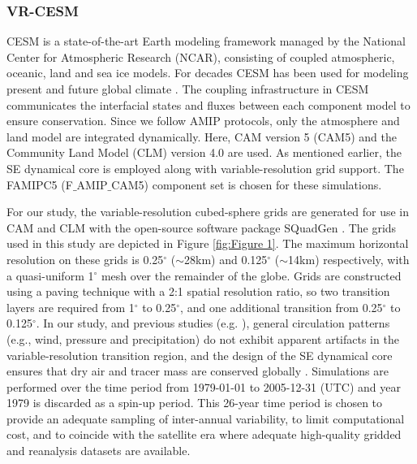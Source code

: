 \documentclass[draft,ms]{agutex}   %
\begin{document}
\begin{article}
\subsubsection{VR-CESM}

CESM is a state-of-the-art Earth modeling framework managed by the National Center for Atmospheric Research (NCAR), consisting of coupled atmospheric, oceanic, land and sea ice models.  For decades CESM has been used for modeling present and future global climate \citep{neale2010description, hurrell2013community}.  The coupling infrastructure in CESM communicates the interfacial states and fluxes between each component model to ensure conservation. Since we follow AMIP protocols, only the atmosphere and land model are integrated dynamically. Here, CAM version 5 (CAM5) \citep{CAM5Tech} and the Community Land Model (CLM) version 4.0 \citep{CLM40Tech} are used. As mentioned earlier, the SE dynamical core is employed along with variable-resolution grid support. The FAMIPC5 (F$\_$AMIP$\_$CAM5) component set is chosen for these simulations.

For our study, the variable-resolution cubed-sphere grids are generated for use in CAM and CLM with the open-source software package SQuadGen \citep{ullrich2014squadgen,guba2014spectral}. The grids used in this study are depicted in Figure \ref{fig:Figure 1}.  The maximum horizontal resolution on these grids is 0.25$^\circ$ ($\sim$28km) and 0.125$^\circ$ ($\sim$14km) respectively, with a quasi-uniform 1$^\circ$ mesh over the remainder of the globe. Grids are constructed using a paving technique with a 2:1 spatial resolution ratio, so two transition layers are required from 1$^\circ$ to 0.25$^\circ$, and one additional transition from 0.25$^\circ$ to 0.125$^\circ$. In our study, and previous studies (e.g. \cite{zarzycki2015effects}), general circulation patterns (e.g., wind, pressure and precipitation) do not exhibit apparent artifacts in the variable-resolution transition region, and the design of the SE dynamical core ensures that dry air and tracer mass are conserved globally \citep{taylor2010compatible}. Simulations are performed over the time period from 1979-01-01 to 2005-12-31 (UTC) and year 1979 is discarded as a spin-up period. This 26-year time period is chosen to provide an adequate sampling of inter-annual variability, to limit computational cost, and to coincide with the satellite era where adequate high-quality gridded and reanalysis datasets are available.


\end{article}
\end{document}
